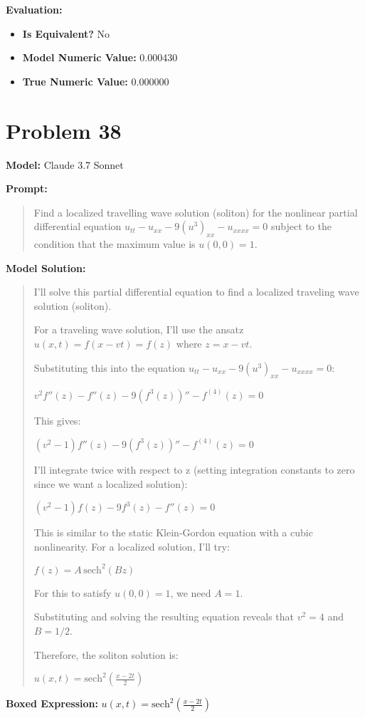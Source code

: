 \documentclass{article}
\begin{document}
\textbf{Evaluation:}
\begin{itemize}
\item \textbf{Is Equivalent?} No
\item \textbf{Model Numeric Value:} 0.000430
\item \textbf{True Numeric Value:} 0.000000
\end{itemize}
\vspace{1cm}
\section*{Problem 38}
\textbf{Model:} Claude 3.7 Sonnet

\textbf{Prompt:}
\begin{quote}
Find a localized travelling wave solution (soliton) for the nonlinear partial differential equation $u_{tt} - u_{xx} - 9(u^3)_{xx} - u_{xxxx}=0$ subject to the condition that the maximum value is $u(0,0) = 1$.
\end{quote}
\textbf{Model Solution:}
\begin{quote}
I'll solve this partial differential equation to find a localized traveling wave solution (soliton).



For a traveling wave solution, I'll use the ansatz $u(x,t) = f(x-vt) = f(z)$ where $z = x-vt$.



Substituting this into the equation $u_{tt} - u_{xx} - 9(u^3)_{xx} - u_{xxxx}=0$:



$v^2f''(z) - f''(z) - 9(f^3(z))'' - f^{(4)}(z) = 0$



This gives:

$(v^2 - 1)f''(z) - 9(f^3(z))'' - f^{(4)}(z) = 0$



I'll integrate twice with respect to z (setting integration constants to zero since we want a localized solution):

$(v^2 - 1)f(z) - 9f^3(z) - f''(z) = 0$



This is similar to the static Klein-Gordon equation with a cubic nonlinearity. For a localized solution, I'll try:

$f(z) = A\,\text{sech}^2(Bz)$



For this to satisfy $u(0,0) = 1$, we need $A = 1$.



Substituting and solving the resulting equation reveals that $v^2 = 4$ and $B = 1/2$.



Therefore, the soliton solution is:



$\boxed{u(x,t) = \text{sech}^2\left(\frac{x-2t}{2}\right)}$
\end{quote}
\textbf{Boxed Expression:} $u(x,t) = \text{sech}^2\left(\frac{x-2t}{2}\right)$
\end{document}
